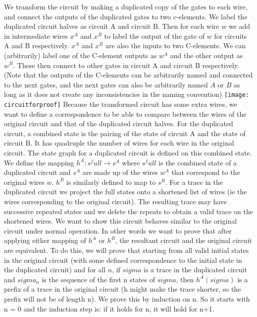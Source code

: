 \documentclass{article}
\begin{document}
We transform the circuit by making a duplicated copy of the gates to each wire, and connect the outputs of the duplicated gates to two c-elements.  We label the duplicated circuit halves as circuit A and circuit B.  Then for each wire $w$ we add in intermediate wires $x^A$ and $x^B$ to label the output of the gate of $w$ for circuits A and B respectively.  $x^A$ and $x^B$ are also the inputs to two C-elements.  We can (arbitrarily) label one of the C-element outputs as $w^A$ and the other output as $w^B$.  These then connect to other gates in circuit A and circuit B respectively.  (Note that the outputs of the C-elements can be arbitrarily named and connected to the next gates, and the next gates can also be arbitrarily named $A$ or $B$ as long as it does not create any inconsistencies in the naming convention) %
\newline
\texttt{[image: circuitforproof]}
Because the transformed circuit has some extra wires, we want to define a correspondence to be able to compare between the wires of the original circuit and that of the duplicated circuit halves.  For the duplicated circuit, a combined state is the pairing of the state of circuit A and the state of circuit B. It has quadruple the number of wires for each wire in the original circuit.  The state graph for a duplicated circuit is defined on this combined state.  We define the mapping $h^A: s^full \to s^A$ where $s^full$ is the combined state of a duplicated circuit and $s^A$ are made up of the wires $w^A$ that correspond to the original wires $w$.  $h^B$ is similarly defined to map to $s^B$.  %
For a trace in the duplicated circuit we project the full states onto a shortened list of wires (ie the wires corresponding to the original circuit). The resulting trace may have successive repeated states and we delete the repeats to obtain a valid trace on the shortened wires.  %
\newline
We want to show this circuit behaves similar to the original circuit under normal operation.  In other words we want to prove that after applying either mapping of $h^A$ or $h^B$, the resultant circuit and the original circuit are equivalent.  To do this, we will prove that starting from all valid initial states in the original circuit (with some defined correspondence to the initial state in the duplicated circuit) and for all $n$, if $sigma$ is a trace in the duplicated circuit and $sigma_n$ is the sequence of the first n states of $sigma$, then $h^A(sigma)$ is a prefix of a trace in the original circuit  (h might make the trace shorter, so the prefix will not be of length n).  We prove this by induction on n.  So it starts with n = 0 and the induction step is: if it holds for n, it will hold for n+1.%
\end{document}
